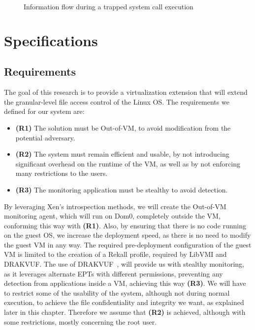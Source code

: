 \begin{figure}[ht]
	\centering
	
	\caption{Information flow during a trapped system call execution}
	\label{fig:overview}
\end{figure}


\section{Specifications}\label{sec:specs}



\subsection{Requirements}\label{sub:requirements}
The goal of this research is to provide a virtualization extension that will extend the granular-level file access control of the Linux \ac{OS}. The requirements we defined for our system are:
\begin{itemize}
	\item \textbf{(R1)} The solution must be Out-of-VM, to avoid modification from the potential adversary. 
	\item \textbf{(R2)} The system must remain efficient and usable, by not introducing significant overhead on the runtime of the \ac{VM}, as well as by not enforcing many restrictions to the users. 
	\item \textbf{(R3)} The monitoring application must be stealthy to avoid detection.
\end{itemize}

By leveraging Xen's introspection methods, we will create the Out-of-VM monitoring agent, which will run on Dom0, completely outside the \ac{VM}, conforming this way with \textbf{(R1)}. Also, by ensuring that there is no code running on the guest \ac{OS}, we increase the deployment speed, as there is no need to modify the guest \ac{VM} in any way. The required pre-deployment configuration of the guest \ac{VM} is limited to the creation of a Rekall profile, required by LibVMI and DRAKVUF. The use of DRAKVUF~\cite{lengyel2014drakvuf}, will provide us with stealthy monitoring, as it leverages alternate \ac{EPT}s with different permissions, preventing any detection from applications inside a \ac{VM}, achieving this way \textbf{(R3)}. We will have to restrict some of the usability of the system, although not during normal execution, to achieve the file confidentiality and integrity we want, as explained later in this chapter. Therefore we assume that \textbf{(R2)} is achieved, although with some restrictions, mostly concerning the root user.

